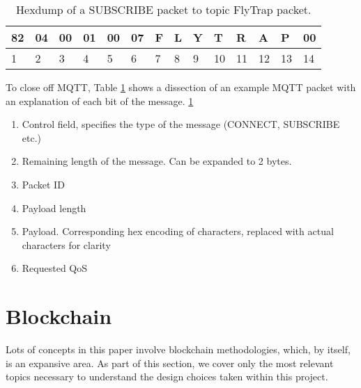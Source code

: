 \begin{table}[h]
\centering
\begin{tabular}{llllllllllllll}
\hline
\multicolumn{1}{|l|}{82} & \multicolumn{1}{l|}{04} & \multicolumn{1}{l|}{00} & \multicolumn{1}{l|}{01} & \multicolumn{1}{l|}{00} & \multicolumn{1}{l|}{07} & \multicolumn{1}{l|}{F} & \multicolumn{1}{l|}{L} & \multicolumn{1}{l|}{Y} & \multicolumn{1}{l|}{T} & \multicolumn{1}{l|}{R} & \multicolumn{1}{l|}{A} & \multicolumn{1}{l|}{P} & \multicolumn{1}{l|}{00} \\ \hline
1                        & 2                       & 3                       & 4                       & 5                       & 6                       & 7                      & 8                      & 9                      & 10                     & 11                     & 12                     & 13                     & 14                     
\end{tabular}
\caption{Hexdump of a SUBSCRIBE packet to topic FlyTrap packet.}
\label{tab:sub_packet}
\end{table}

To close off MQTT, Table \ref{tab:sub_packet} shows a dissection of an example MQTT packet with an explanation of each bit of the message. \ref{tab:sub_packet}
\begin{enumerate}
  \item [1] Control field, specifies the type of the message (CONNECT, SUBSCRIBE etc.)
  \item [2] Remaining length of the message. Can be expanded to 2 bytes.
  \item [3-4] Packet ID
  \item [5-6] Payload length
  \item [7-13] Payload. Corresponding hex encoding of characters, replaced with actual characters for clarity
  \item [14] Requested QoS
\end{enumerate}

\section{Blockchain}

Lots of concepts in this paper involve blockchain methodologies, which, by itself, is an expansive area. As part of this section, we cover only the most relevant topics necessary to understand the design choices taken within this project.

